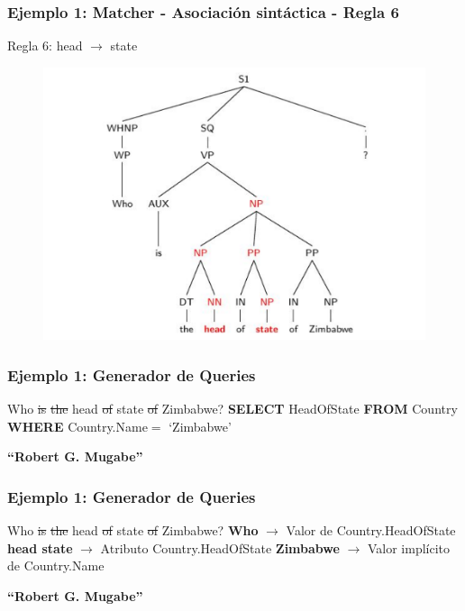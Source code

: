 \begin{frame}[t]
\frametitle{Ejemplo 1: Matcher - Asociación sintáctica - Regla 6}
\Large{Regla 6: head $\rightarrow$ state}
\begin{center}

\begin{figure}
  \centering
    \includegraphics[scale=.5]{graficos/presentacion/ejemplo-charniak-1}
\end{figure}
\end{center}
\end{frame}

\begin{frame}[t]
\frametitle{Ejemplo 1: Generador de Queries}
\Large{{\color{blue}Who} \st{is} \st{the} {\color{blue}head} \st{of} {\color{blue}state} \st{of} {\color{red}Zimbabwe}? 
\bigskip
\newline
{\color{white}\textbf{{\color{white}SELECT}} HeadOfState \newline
{\color{white}\textbf{FROM}} Country \newline
{\color{white}\textbf{WHERE}} Country.Name$=$ {\color{white}`Zimbabwe'}
}}

\bigskip

{\color{white}\textbf{``Robert G. Mugabe''}}

\end{frame}

\begin{frame}[t]
\frametitle{Ejemplo 1: Generador de Queries}
\Large{{\color{blue}Who} \st{is} \st{the} {\color{blue}head} \st{of} {\color{blue}state} \st{of} {\color{red}Zimbabwe}? 
\bigskip
\newline
\textbf{{\color{blue}Who}} $\rightarrow$ Valor de Country.HeadOfState \newline
\textbf{{\color{blue}head state}} $\rightarrow$ Atributo Country.HeadOfState \newline
\textbf{{\color{red}Zimbabwe}} $\rightarrow$ Valor implícito de Country.Name \newline
}

\bigskip

{\color{white}\textbf{``Robert G. Mugabe''}}

\end{frame}

